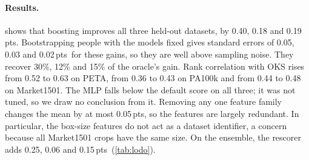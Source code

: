 \documentclass[10pt,twocolumn,letterpaper]{article}
\newcommand{\pts}{\,pts}
\begin{document}
\begin{table}[t]
\centering\small
\setlength{\tabcolsep}{3.2pt}
\caption{Rescorers trained on two datasets and tested on the third (AP $\times100$). Lower block: refits without one feature family.}
\label{tab:rescore}
\end{table}

\paragraph{Results.}  shows that boosting improves all three held-out datasets, by 0.40, 0.18 and 0.19\pts. Bootstrapping people with the models fixed gives standard errors of 0.05, 0.03 and 0.02\pts\ for these gains, so they are well above sampling noise. They recover 30\%, 12\% and 15\% of the oracle's gain. Rank correlation with OKS rises from 0.52 to 0.63 on PETA, from 0.36 to 0.43 on PA100k and from 0.44 to 0.48 on Market1501. The MLP falls below the default score on all three; it was not tuned, so we draw no conclusion from it. Removing any one feature family changes the mean by at most 0.05\pts, so the features are largely redundant. In particular, the box-size features do not act as a dataset identifier, a concern because all Market1501 crops have the same size. On the ensemble, the rescorer adds 0.25, 0.06 and 0.15\pts\ (\cref{tab:lodo}).
\end{document}
